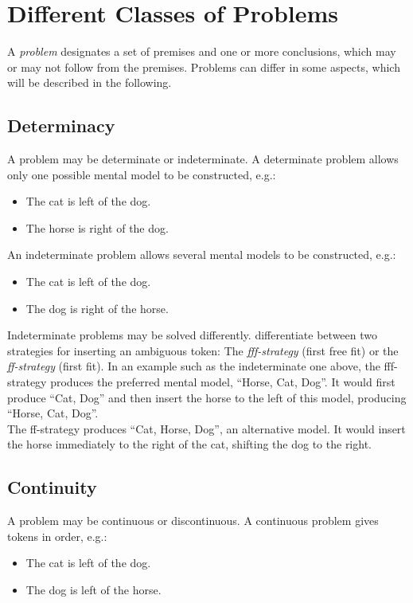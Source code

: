\documentclass[hidelinks]{scrartcl}
\begin{document}
\section{Different Classes of Problems}
A \textit{problem} designates a set of \gls{premise}s and one or more \gls{conclusion}s, which may or may not follow from the \gls{premise}s. Problems can differ in some aspects, which will be described in the following.

\subsection{Determinacy}\label{sec:determinacy}
A problem may be determinate or indeterminate. A determinate problem allows only one possible \gls{mental model} to be constructed, e.g.:
\begin{itemize}
\item The cat is left of the dog.
\item The horse is right of the dog.
\end{itemize}

\noindent An indeterminate problem allows several \gls{mental model}s to be constructed, e.g.:
\begin{itemize}
\item The cat is left of the dog.
\item The dog is right of the horse.
\end{itemize}

Indeterminate problems may be solved differently. \cite{Ragni.2013} differentiate between two strategies for inserting an ambiguous \gls{token}: The \textit{fff-strategy} (first free fit) or the \textit{ff-strategy} (first fit). In an example such as the indeterminate one above, the fff-strategy produces the preferred mental model, ``Horse, Cat, Dog''. It would first produce ``Cat, Dog'' and then insert the horse to the left of this model, producing ``Horse, Cat, Dog''. \\
The ff-strategy produces ``Cat, Horse, Dog'', an alternative model. It would insert the horse immediately to the right of the cat, shifting the dog to the right. 

\subsection{Continuity}
A problem may be continuous or discontinuous. A continuous problem gives \gls{token}s in order, e.g.:
\begin{itemize}
\item The cat is left of the dog.
\item The dog is left of the horse.
\end{itemize}
\end{document}
